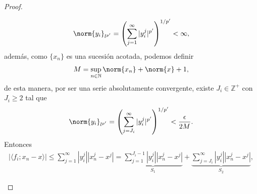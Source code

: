 \begin{proof}
\begin{enumerate}
\begin{itemize}
\begin{align*}
                \norm{y_i}_{l^{p'}}=\left(\sum_{j=1}^\infty |y_i^j|^{p'}\right)^{1/p'}<\infty,
            \end{align*}
            además, como $\{x_n\}$ es una sucesión acotada, podemos definir
            \begin{align*}
                M=\sup_{n \in \mathbb{N}} \norm{x_n}+\norm{x}+1,
            \end{align*}
            de esta manera, por ser una serie absolutamente convergente, existe $J_i\in \mathbb{Z}^+$ con $J_i\geq 2$ tal que 
            \begin{align*}
                \norm{y_i}_{l^{p'}}=\left(\sum_{j=J_i}^\infty |y_i^j|^{p'}\right)^{1/p'}< \dfrac{\epsilon}{2M}.
            \end{align*}
            Entonces
            \begin{align*}
                |\langle f_i;x_n-x\rangle|\leq \sum_{j=1}^\infty|y_i^j||x_n^j-x^j|=\underbrace{\sum_{j=1}^{J_i-1}|y_i^j||x_n^j-x^j|}_{S_1}+\underbrace{\sum_{j=J_i}^\infty |y_i^j||x_n^j-x^j|}_{S_2},
            \end{align*}


\end{itemize}
\end{enumerate}
\end{proof}

